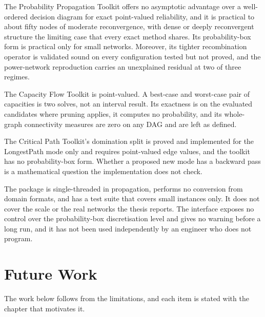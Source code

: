 \documentclass[12pt]{report}
\begin{document}
The Probability Propagation Toolkit offers no asymptotic advantage over a well-ordered
decision diagram for exact point-valued reliability, and it is practical to about fifty
nodes of moderate reconvergence, with dense or deeply reconvergent structure the limiting
case that every exact method shares. Its probability-box form is practical only for small
networks. Moreover, its tighter recombination operator is validated sound on every
configuration tested but not proved, and the power-network reproduction carries an
unexplained residual at two of three regimes.

The Capacity Flow Toolkit is point-valued. A best-case and worst-case pair of capacities is
two solves, not an interval result. Its exactness is on the evaluated candidates where
pruning applies, it computes no probability, and its whole-graph connectivity measures are
zero on any DAG and are left as defined.

The Critical Path Toolkit's domination split is proved and implemented for the LongestPath
mode only and requires point-valued edge values, and the toolkit has no probability-box
form. Whether a proposed new mode has a backward pass is a mathematical question the
implementation does not check.

The package is single-threaded in propagation, performs no conversion from domain formats,
and has a test suite that covers small instances only. It does not cover the scale or the
real networks the thesis reports. The interface exposes no control over the probability-box discretisation
level and gives no warning before a long run, and it has not been used independently by an
engineer who does not program.

\section{Future Work}
\label{sec:concl-future}

The work below follows from the limitations, and each item is stated with the chapter that
motivates it.
\end{document}

